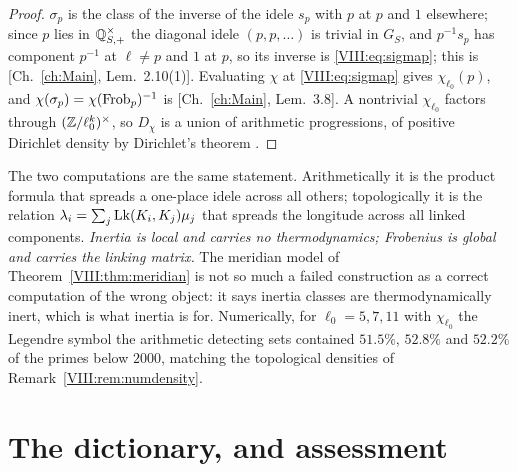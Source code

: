 \begin{proof}
$\sigma_p$ is the class of the inverse of the idele $s_p$ with $p$ at $p$ and $1$ elsewhere;
since $p$ lies in $\mathbb{Q}^\times_{S,+}$ the diagonal idele $(p,p,\dots)$ is trivial in $G_S$, and
$p^{-1}s_p$ has component $p^{-1}$ at $\ell\ne p$ and $1$ at $p$, so its inverse is
\eqref{VIII:eq:sigmap}; this is [Ch.~\ref{ch:Main}, Lem.~2.10(1)]. Evaluating $\chi$ at \eqref{VIII:eq:sigmap}
gives $\chi_{\ell_0}(p)$, and $\chi(\sigma_p)=\chi(\operatorname{Frob}_p)^{-1}$ is [Ch.~\ref{ch:Main}, Lem.~3.8].
A nontrivial $\chi_{\ell_0}$ factors through $(\mathbb{Z}/\ell_0^k)^\times$, so $D_\chi$ is a union
of arithmetic progressions, of positive Dirichlet density by Dirichlet's theorem
\cite[Ch.~VII]{Neukirch}.
\end{proof}

\begin{remark}\label{VIII:rem:moral}
The two computations are the same statement. Arithmetically it is the product formula that
spreads a one-place idele across all others; topologically it is the relation
$\lambda_i=\sum_j\operatorname{Lk}(K_i,K_j)\mu_j$ that spreads the longitude across all linked components.
\emph{Inertia is local and carries no thermodynamics; Frobenius is global and carries the
linking matrix.} The meridian model of Theorem~\ref{VIII:thm:meridian} is not so much a failed
construction as a correct computation of the wrong object: it says inertia classes are
thermodynamically inert, which is what inertia is for. Numerically, for
$\ell_0=5,7,11$ with $\chi_{\ell_0}$ the Legendre symbol the arithmetic detecting sets
contained $51.5\%$, $52.8\%$ and $52.2\%$ of the primes below $2000$, matching the
topological densities of Remark~\ref{VIII:rem:numdensity}.
\end{remark}

\section{The dictionary, and assessment}\label{VIII:sec:dict}

